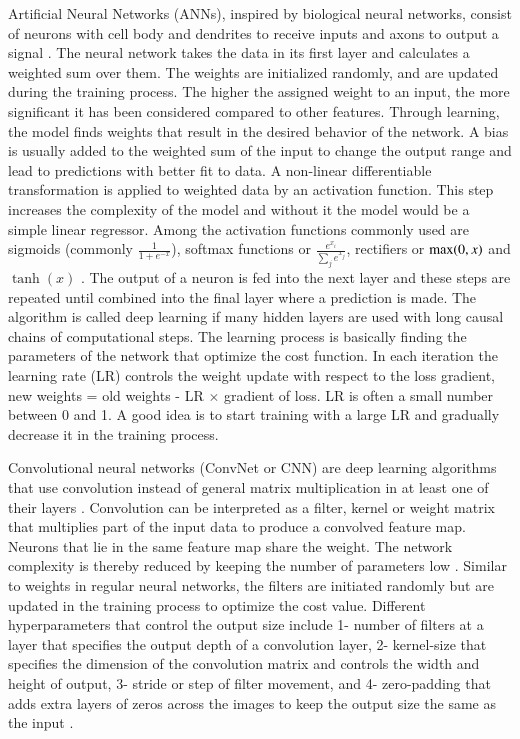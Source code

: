 \documentclass[fleqn,usenatbib]{mnras}
\begin{document}
Artificial Neural Networks (ANNs), inspired by biological neural networks,  consist of neurons with cell body and dendrites to receive inputs and axons to output a signal \citep{jain1996artificial,hassoun1995fundamentals,yegnanarayana2009artificial}. The neural network takes the data in its first layer and calculates a weighted sum over them.  The weights are initialized  randomly, and are updated  during the training process.
  The higher the assigned weight to an input, the more significant it has been considered compared to other features. Through learning,  the model finds weights that result in the desired behavior of  the network. 
    A bias is usually added to the weighted sum of the input to change the output range and lead to predictions with better fit to data.
 A non-linear differentiable transformation is applied to weighted data by an activation function. This step increases the complexity of the model and without it the model would be a simple linear regressor.
Among the activation functions commonly used are sigmoids (commonly $\frac{1}{1+e^{-x}}$), softmax functions or $\frac{e^{x_i}}{\sum_j{e^{x_j}}}$,  rectifiers or ${\rm max}(0,x)$ and $\tanh(x)$ \citep{nwankpa2018activation}.
%
The output of a neuron is fed into the next layer and these steps are repeated until combined into the final layer where a prediction is made.
%
The algorithm is called deep learning if many hidden layers are used with long causal chains of computational steps. 
The learning process is basically finding the parameters  of the network
that optimize the cost function. 
%
In each iteration the learning rate (LR) controls the weight update with respect to the loss gradient,  new weights = old weights - LR $\times$ gradient of loss. LR is often a small number between 0 and 1. A good idea is to start training with a large LR and gradually decrease it in the training process.

Convolutional neural networks (ConvNet or CNN) are deep learning algorithms
 that use convolution instead of general matrix multiplication in at least one of their layers \citep{krizhevsky2012imagenet,gu2018recent}.
Convolution can be interpreted as a filter, kernel or weight matrix that multiplies part of the input data 
to produce a convolved feature map.
Neurons that lie in the same feature map share the weight.   
The network complexity is thereby reduced by keeping the number of parameters low \citep{hinton2012improving}.
% 
Similar to weights in regular neural networks, the filters are initiated randomly but 
are updated in the training process to optimize the cost value.
%
Different hyperparameters  that control the output size include 1- number of filters at a layer that specifies the output depth of a convolution layer, 2- kernel-size that specifies the dimension of the convolution matrix and controls the width and height of output, 3- stride or step of filter movement, and 4- zero-padding  that adds extra layers of zeros across the images to keep the output size the same as the input \citep{aloysius2017review}.
\end{document}
